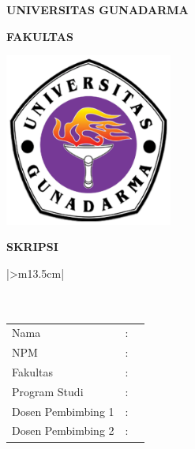 \documentclass[12pt,oneside,bahasa]{book}
\providecommand{\tabularnewline}{\\}
\begin{document}

\sloppy
\thispagestyle{empty}


\pagestyle{romanstyle}

\vspace*{10mm}

\begin{center}
  {\large\textbf{UNIVERSITAS GUNADARMA}}{\large\par}
  \par\end{center}

\begin{center}
  {\large\textbf{FAKULTAS \MakeUppercase{\Fakultas}}}{\large\par}
  \par\end{center}

\vspace*{10mm}

\begin{center}
  \includegraphics[width=55mm]{images/gundarlogo.png}
  \par\end{center}

\vspace*{3mm}

\begin{center}
  {\Large\textbf{SKRIPSI}}{\Large\par}
  \par\end{center}

\vspace*{7mm}

\begin{center}
  \begin{tabular}{|>{\centering}m{13.5cm}|}
    \hline
    \centering{}~~\tabularnewline
    \centering{}\textbf{\MakeUppercase{\Judul}}\tabularnewline
    ~~\tabularnewline
    \centering{}%
    \begin{tabular}{lcl}
      Nama               & : & \Penulis\tabularnewline
      NPM                & : & \NPM\tabularnewline
      Fakultas           & : & \Fakultas\tabularnewline
      Program Studi      & : & \Jurusan\tabularnewline
      Dosen Pembimbing 1 & : & \DosenPembimbingA\tabularnewline
      Dosen Pembimbing 2 & : & \DosenPembimbingB\tabularnewline
    \end{tabular}\tabularnewline
    ~~\tabularnewline
    \hline
  \end{tabular}
  \par\end{center}
\end{document}
